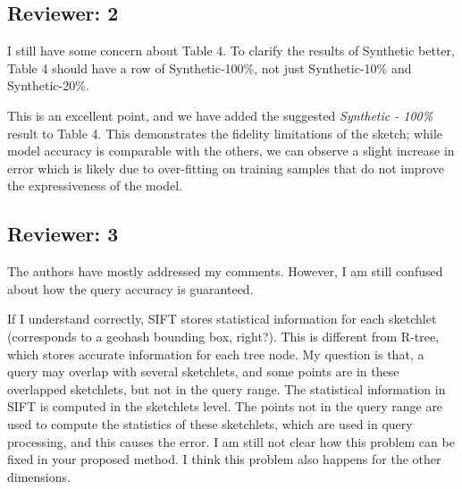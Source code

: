 \documentclass{article}
\begin{document}
\subsection*{Reviewer: 2}\label{reviewer-2}

I still have some concern about Table 4. To clarify the results of Synthetic better, Table 4 should have a row of Synthetic-100\%, not just Synthetic-10\% and Synthetic-20\%.

\begin{tcolorbox}
    This is an excellent point, and we have added the suggested \emph{Synthetic - 100\%} result to Table 4. This demonstrates the fidelity limitations of the sketch; while model accuracy is comparable with the others, we can observe a slight increase in error which is likely due to over-fitting on training samples that do not improve the expressiveness of the model.
\end{tcolorbox}

\vspace{1em}

\subsection*{Reviewer: 3}\label{reviewer-3}

The authors have mostly addressed my comments. However, I am still confused about how the query accuracy is guaranteed.

If I understand correctly, SIFT stores statistical information for each sketchlet (corresponds to a geohash bounding box, right?). This is different from R-tree, which stores accurate information for each tree node. My question is that, a query may overlap with several sketchlets, and some points are in these overlapped sketchlets, but not in the query range. The statistical information in SIFT is computed in the sketchlets level. The points not in the query range are used to compute the statistics of these sketchlets, which are used in query processing, and this causes the error. I am still not clear how this problem can be fixed in your proposed method. I think this problem also happens for the other dimensions.
\end{document}
